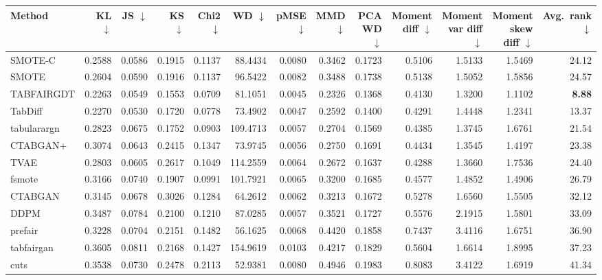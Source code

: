 \begin{table}[t]
\centering
\scriptsize
\setlength\tabcolsep{3pt}
\begin{tabular}{lrrrrrrrrrrrr}
\toprule
\textbf{Method} & \textbf{KL} $\downarrow$ & \textbf{JS} $\downarrow$ & \textbf{KS} $\downarrow$ & \textbf{Chi2} $\downarrow$ & \textbf{WD} $\downarrow$ & \textbf{pMSE} $\downarrow$ & \textbf{MMD} $\downarrow$ & \textbf{PCA WD} $\downarrow$ & \textbf{Moment diff} $\downarrow$ & \textbf{Moment var diff} $\downarrow$ & \textbf{Moment skew diff} $\downarrow$ & \textbf{Avg.\ rank} $\downarrow$ \\
\midrule
SMOTE-C & 0.2588 & 0.0586 & 0.1915 & 0.1137 & 88.4434 & 0.0080 & 0.3462 & 0.1723 & 0.5106 & 1.5133 & 1.5469 & 24.12 \\
SMOTE & 0.2604 & 0.0590 & 0.1916 & 0.1137 & 96.5422 & 0.0082 & 0.3488 & 0.1738 & 0.5138 & 1.5052 & 1.5856 & 24.57 \\
\midrule
TABFAIRGDT & 0.2263 & 0.0549 & 0.1553 & 0.0709 & 81.1051 & 0.0045 & 0.2326 & 0.1368 & 0.4130 & 1.3200 & 1.1102 & \textbf{8.88} \\
TabDiff & 0.2270 & 0.0530 & 0.1720 & 0.0778 & 73.4902 & 0.0047 & 0.2592 & 0.1400 & 0.4291 & 1.4448 & 1.2341 & 13.37 \\
tabularargn & 0.2823 & 0.0675 & 0.1752 & 0.0903 & 109.4713 & 0.0057 & 0.2704 & 0.1569 & 0.4385 & 1.3745 & 1.6761 & 21.54 \\
CTABGAN+ & 0.3074 & 0.0643 & 0.2415 & 0.1347 & 73.9745 & 0.0056 & 0.2750 & 0.1691 & 0.4434 & 1.3545 & 1.4197 & 23.38 \\
TVAE & 0.2803 & 0.0605 & 0.2617 & 0.1049 & 114.2559 & 0.0064 & 0.2672 & 0.1637 & 0.4288 & 1.3660 & 1.7536 & 24.40 \\
fsmote & 0.3166 & 0.0740 & 0.1907 & 0.0991 & 101.7921 & 0.0065 & 0.3200 & 0.1685 & 0.4577 & 1.4852 & 1.4906 & 26.79 \\
CTABGAN & 0.3145 & 0.0678 & 0.3026 & 0.1284 & 64.2612 & 0.0062 & 0.3213 & 0.1672 & 0.5278 & 1.6560 & 1.5505 & 32.12 \\
DDPM & 0.3487 & 0.0784 & 0.2100 & 0.1210 & 87.0285 & 0.0057 & 0.3521 & 0.1727 & 0.5576 & 2.1915 & 1.5801 & 33.09 \\
prefair & 0.3228 & 0.0704 & 0.2151 & 0.1482 & 56.1625 & 0.0068 & 0.4420 & 0.1858 & 0.7437 & 3.4116 & 1.6751 & 36.90 \\
tabfairgan & 0.3605 & 0.0811 & 0.2168 & 0.1427 & 154.9619 & 0.0103 & 0.4217 & 0.1829 & 0.5604 & 1.6614 & 1.8995 & 37.23 \\
cuts & 0.3538 & 0.0730 & 0.2478 & 0.2113 & 52.9381 & 0.0080 & 0.4946 & 0.1983 & 0.8083 & 3.4122 & 1.6919 & 41.34 \\

\end{tabular}
\end{table}
